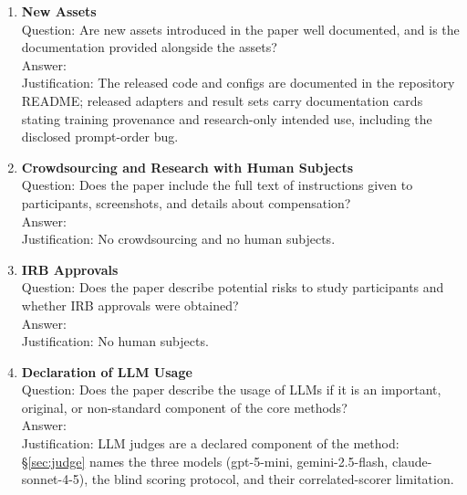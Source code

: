 \documentclass{article}
\begin{document}
\begin{enumerate}
\item \textbf{New Assets}\\
Question: Are new assets introduced in the paper well documented, and is the
documentation provided alongside the assets?\\
Answer: \answerYes{}\\
Justification: The released code and configs are documented in the repository
README; released adapters and result sets carry documentation cards stating
training provenance and research-only intended use, including the disclosed
prompt-order bug.

\item \textbf{Crowdsourcing and Research with Human Subjects}\\
Question: Does the paper include the full text of instructions given to
participants, screenshots, and details about compensation?\\
Answer: \answerNA{}\\
Justification: No crowdsourcing and no human subjects.

\item \textbf{IRB Approvals}\\
Question: Does the paper describe potential risks to study participants and
whether IRB approvals were obtained?\\
Answer: \answerNA{}\\
Justification: No human subjects.

\item \textbf{Declaration of LLM Usage}\\
Question: Does the paper describe the usage of LLMs if it is an important,
original, or non-standard component of the core methods?\\
Answer: \answerYes{}\\
Justification: LLM judges are a declared component of the method:
\S\ref{sec:judge} names the three models (gpt-5-mini, gemini-2.5-flash,
claude-sonnet-4-5), the blind scoring protocol, and their correlated-scorer
limitation.

\end{enumerate}
\end{document}
